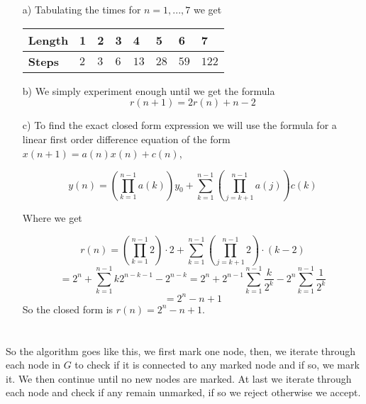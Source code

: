 \documentclass{article}
\begin{document}
	\newpage
	\section{}
	\begin{itemize}
		\item[a)] Tabulating the times for $n = 1,...,7$ we get

			\begin{center}
				\begin{tabular}[c]{|l|l|l|l|l|l|l|l|}
					\hline
					\textbf{Length} & \textbf{1} & \textbf{2} & \textbf{3} & \textbf{4} & \textbf{5} & \textbf{6} & \textbf{7} \\
					\hline
					\hline
					\textbf{Steps} & $2$ & $3$ & $6$ & $13$ & $28$ & $59$ & $122$ \\
					\hline
				\end{tabular}
			\end{center}
		
		\item[b)] We simply experiment enough until we get the formula 
			\begin{equation}
				r(n+1) = 2r(n) + n - 2
				\label{eq:gamer}
			\end{equation}
		\item[c)] To find the exact closed form expression we will use 
			the formula for a linear first order difference equation of the 
			form $x(n+1) = a(n)x(n) + c(n)$,

			\begin{equation}
				y(n) = \left( \prod_{k=1}^{n-1} a(k) \right)y_0 
				+ \sum_{k=1}^{n-1}\left( \prod_{j=k+1}^{n-1}a(j)\right)c(k)
				\label{eq:gamer1}
			\end{equation}

			Where we get

			\[
				r(n) = \left( \prod_{k=1}^{n-1} 2 \right)\cdot 2
				+ \sum_{k=1}^{n-1}\left( \prod_{j=k+1}^{n-1}2\right)\cdot(k-2)
			\]
			\[
				= 2^n + \sum_{k=1}^{n-1} k2^{n-k-1} - 2^{n-k}
			= 2^n + 2^{n-1}\sum_{k=1}^{n-1}\frac{k}{2^k} - 2^n\sum_{k=1}^{n-1}\frac{1}{2^k}
			\]
			\[
				= 2^n - n + 1
			\]
			So the closed form is $r(n) = 2^n - n + 1$.
	\end{itemize}

	\section{}
	So the algorithm goes like this, we first mark one node, then, we 
	iterate through each node in $G$ to check if it is connected to 
	any marked node and if so, we mark it. We then continue until no 
	new nodes are marked. At last we iterate through each node and check 
	if any remain unmarked, if so we reject otherwise we accept.
\end{document}
